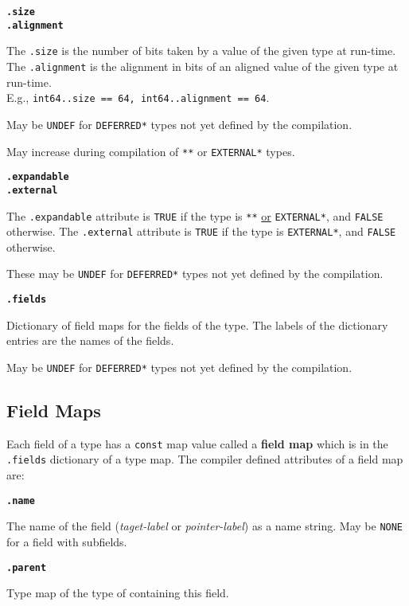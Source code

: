 \documentclass[12pt]{article}
\newcommand{\key}[1]{{\rm \bfseries #1}}
\newcommand{\ttkey}[1]{{\tt \bfseries #1}}
\newenvironment{indpar}[1][0.3in]%
	{\begin{list}{}%
		     {\setlength{\itemsep}{0in}%
		      \setlength{\topsep}{0in}%
		      \setlength{\parsep}{1ex}%
		      \setlength{\labelwidth}{#1}%
		      \setlength{\leftmargin}{#1}%
		      \addtolength{\leftmargin}{\labelsep}}%
	 \item}%
	{\end{list}}
\begin{document}
\ttkey{.size} \\
\ttkey{.alignment}
\begin{indpar}
The {\tt .size} is the number of bits taken by a value of the given type at
run-time.
The {\tt .alignment} is the alignment in bits
of an aligned value of the given type at
run-time.
\\ E.g., {\tt int64..size == 64, int64..alignment == 64}.

May be {\tt UNDEF} for {\tt *DEFERRED*} types not yet defined by the
compilation.

May increase during compilation of {\tt ***} or
{\tt *EXTERNAL*} types.
\end{indpar}

\ttkey{.expandable} \\
\ttkey{.external}
\begin{indpar}
The {\tt .expandable} attribute is {\tt TRUE} if the
type is {\tt ***} \underline{or} {\tt *EXTERNAL*},
and {\tt FALSE} otherwise.
The {\tt .external} attribute is {\tt TRUE} if the type is
{\tt *EXTERNAL*}, and {\tt FALSE} otherwise.

These may be {\tt UNDEF} for {\tt *DEFERRED*} types not yet defined
by the compilation.
\end{indpar}

\ttkey{.fields}
\begin{indpar}
Dictionary of field maps for the fields of the type.  The labels
of the dictionary entries are the names of the fields.

May be {\tt UNDEF} for {\tt *DEFERRED*} types not yet defined
by the compilation.
\end{indpar}

\subsection{Field Maps}
\label{FIELD-MAPS}

Each field of a type has a {\tt const} map value called
a \key{field map} which is in the {\tt .fields} dictionary of
a type map.  The compiler defined attributes of a field map are:

\ttkey{.name}
\begin{indpar}
The name of the field ({\em taget-label} or {\em pointer-label})
as a name string.  May be {\tt NONE} for a field with subfields.
\end{indpar}

\ttkey{.parent}
\begin{indpar}
Type map of the type of containing this field.
\end{indpar}
\end{document}
